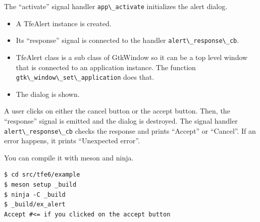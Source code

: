 The ``activate'' signal handler \passthrough{\lstinline!app\_activate!}
initializes the alert dialog.

\begin{itemize}
\tightlist
\item
  A TfeAlert instance is created.
\item
  Its ``response'' signal is connected to the handler
  \passthrough{\lstinline!alert\_response\_cb!}.
\item
  TfeAlert class is a sub class of GtkWindow so it can be a top level
  window that is connected to an application instance. The function
  \passthrough{\lstinline!gtk\_window\_set\_application!} does that.
\item
  The dialog is shown.
\end{itemize}

A user clicks on either the cancel button or the accept button. Then,
the ``response'' signal is emitted and the dialog is destroyed. The
signal handler \passthrough{\lstinline!alert\_response\_cb!} checks the
response and prints ``Accept'' or ``Cancel''. If an error happens, it
prints ``Unexpected error''.

You can compile it with meson and ninja.

\begin{lstlisting}
$ cd src/tfe6/example
$ meson setup _build
$ ninja -C _build
$ _build/ex_alert
Accept #<= if you clicked on the accept button
\end{lstlisting}
